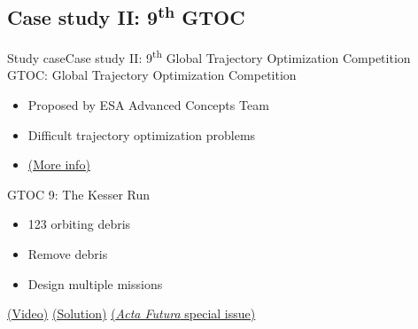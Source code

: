 \documentclass[10pt,compress]{beamer} %
\begin{document}

\subsection{Case study II: 9\textsuperscript{th} GTOC}
\begin{frame}{Study case}{Case study II: 9\textsuperscript{th} Global Trajectory Optimization Competition}
    GTOC: Global Trajectory Optimization Competition
    \begin{itemize}
        \item Proposed by ESA Advanced Concepts Team
        \item Difficult trajectory optimization problems
	\item \href{https://sophia.estec.esa.int/gtoc_portal/?page_id=814}{(More info)}
    \end{itemize}

    GTOC 9: The Kesser Run
    \begin{itemize}
        \item 123 orbiting debris
        \item Remove debris
        \item Design multiple missions
    \end{itemize}
    \href{https://www.youtube.com/watch?v=zvxZx-QnqQ0}{(Video)}
    \href{https://www.youtube.com/watch?v=5CQNG6OIbZM}{(Solution)}
	\href{https://www.esa.int/gsp/ACT/acta_futura/issue11/}{(\textit{Acta Futura} special issue)}
\end{frame}
\end{document}
